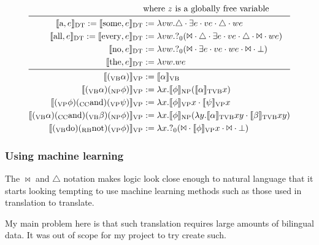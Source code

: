 \documentclass[12pt]{article}
\begin{document}
\begin{equation*}
\begin{aligned}
& \text{where $z$ is a globally free variable}\\
\midrule\ 
%
\llbracket \text{a}, e\rrbracket_\text{DT} := \llbracket \text{some}, e\rrbracket_\text{DT} &:= \lambda vw.\triangle\cdot\exists e\cdot ve\cdot\triangle\cdot we\\
\llbracket \text{all}, e\rrbracket_\text{DT} := \llbracket \text{every}, e\rrbracket_\text{DT} &:= \lambda vw.?_0(\Bowtie\cdot\triangle\cdot\exists e\cdot ve\cdot\triangle\cdot\Bowtie\cdot we)\\
\llbracket \text{no}, e\rrbracket_\text{DT} &:= \lambda vw.?_0(\Bowtie\cdot\exists e\cdot ve\cdot we\cdot\Bowtie\cdot\bot)\\
\llbracket \text{the}, e\rrbracket_\text{DT} &:= \lambda vw.we\\
\midrule\ 
%
\llbracket (_\text{VB}\alpha)\rrbracket_\text{VP} &:= \llbracket \alpha\rrbracket_\text{VB}\\
\llbracket (_\text{VB}\alpha)(_\text{NP}\phi)\rrbracket_\text{VP} &:= \lambda x.\llbracket \phi\rrbracket_\text{NP} (\llbracket \alpha\rrbracket_\text{TVB} x)\\
\llbracket (_\text{VP}\phi)(_\text{CC}\text{and})(_\text{VP}\psi)\rrbracket_\text{VP} &:= \lambda x.\llbracket \phi\rrbracket_\text{VP}x\cdot \llbracket \psi\rrbracket_\text{VP}x\\
\llbracket (_\text{VB}\alpha)(_\text{CC}\text{and})(_\text{VB}\beta)(_\text{NP}\phi)\rrbracket_\text{VP} &:= \lambda x.\llbracket \phi\rrbracket_\text{NP}(\lambda y.\llbracket \alpha\rrbracket_\text{TVB}xy\cdot \llbracket \beta\rrbracket_\text{TVB}xy)\\
\llbracket (_\text{VB}\text{do})(_\text{RB}\text{not})(_\text{VP}\phi)\rrbracket_\text{VP} &:= \lambda x.?_0(\Bowtie\cdot\llbracket \phi\rrbracket_\text{VP}x\cdot\Bowtie\cdot\bot)
\end{aligned}\end{equation*}


\subsubsection{Using machine learning}
The $\bowtie$ and $\triangle$ notation makes logic look close enough to natural language that it starts looking tempting to use machine learning methods such as those used in translation to translate.

My main problem here is that such translation requires large amounts of bilingual data. It was out of scope for my project to try create such.
\end{document}
